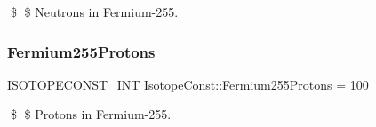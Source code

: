 \$ \$ Neutrons in Fermium-\/255. \mbox{\label{group___isotope_const-_fermium-_fm255_ga02b626194156fc833a8e16e652d4f250}} 
\subsubsection{\texorpdfstring{Fermium255\+Protons}{Fermium255Protons}}
{\footnotesize\ttfamily \mbox{\hyperlink{group___isotope_const-_macros_ga5f18360b3e99483a35c32d789e62621c}{I\+S\+O\+T\+O\+P\+E\+C\+O\+N\+S\+T\+\_\+\+I\+NT}} Isotope\+Const\+::\+Fermium255\+Protons = 100}

\$ \$ Protons in Fermium-\/255. 